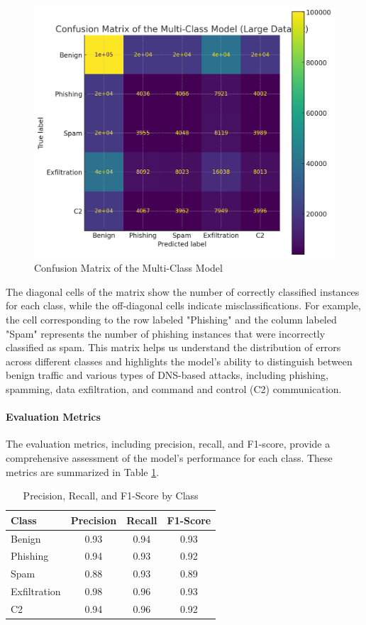 \begin{figure}
    \centering
    \includegraphics[width=1\linewidth]{Chap3//images/confusionMatrixmuliclass.png}
    \caption{Confusion Matrix of the Multi-Class Model}
    \label{}
\end{figure}
The diagonal cells of the matrix show the number of correctly classified instances for each class, while the off-diagonal cells indicate misclassifications. For example, the cell corresponding to the row labeled "Phishing" and the column labeled "Spam" represents the number of phishing instances that were incorrectly classified as spam. This matrix helps us understand the distribution of errors across different classes and highlights the model's ability to distinguish between benign traffic and various types of DNS-based attacks, including phishing, spamming, data exfiltration, and command and control (C2) communication.

\paragraph{Evaluation Metrics}
The evaluation metrics, including precision, recall, and F1-score, provide a comprehensive assessment of the model's performance for each class. These metrics are summarized in Table \ref{tab:evaluation_metrics}.

\begin{table}[h]
    \centering
    \caption{Precision, Recall, and F1-Score by Class}
    \label{tab:evaluation_metrics}
    \begin{tabular}{|l|c|c|c|}
        \hline
        \textbf{Class} & \textbf{Precision} & \textbf{Recall} & \textbf{F1-Score} \\
        \hline
        Benign & 0.93 & 0.94 & 0.93 \\
        Phishing & 0.94 & 0.93 & 0.92 \\
        Spam & 0.88 & 0.93 & 0.89 \\
        Exfiltration & 0.98 & 0.96 & 0.93 \\
        C2 & 0.94 & 0.96 & 0.92 \\
        \hline
    \end{tabular}
\end{table}

